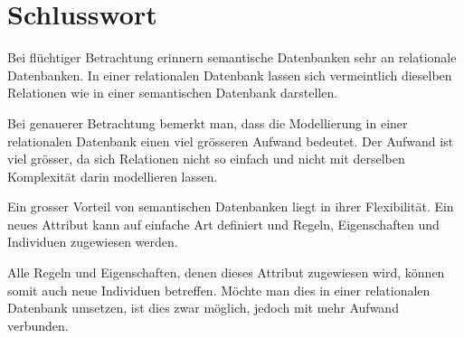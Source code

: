 \chapter{Schlusswort}
\label{chap:schlusswort}


Bei flüchtiger Betrachtung erinnern semantische Datenbanken sehr an relationale Datenbanken. In einer relationalen Datenbank lassen sich vermeintlich dieselben Relationen wie in einer semantischen Datenbank darstellen.

Bei genauerer Betrachtung bemerkt man, dass die Modellierung in einer relationalen Datenbank einen viel grösseren Aufwand bedeutet. Der Aufwand ist viel grösser, da sich Relationen nicht so einfach und nicht mit derselben Komplexität darin modellieren lassen.

Ein grosser Vorteil von semantischen Datenbanken liegt in ihrer Flexibilität. Ein neues Attribut kann auf einfache Art definiert und Regeln, Eigenschaften und Individuen zugewiesen werden.

Alle Regeln und Eigenschaften, denen dieses Attribut zugewiesen wird, können somit auch neue Individuen betreffen. Möchte man dies in einer relationalen Datenbank umsetzen, ist dies zwar möglich, jedoch mit mehr Aufwand verbunden.
